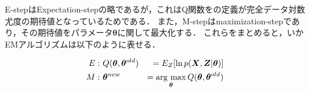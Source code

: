 E-stepはExpectation-stepの略であるが，これはQ関数をの定義が完全データ対数尤度の期待値となっているためである．
また，M-stepはmaximization-stepであり，その期待値をパラメータ$\bm \theta$に関して最大化する．
これらをまとめると，いかEMアルゴリズムは以下のように表せる．

\begin{eqnarray}
  E:& \ Q(\bm\theta, \bm\theta^{old})  &= E_{Z} [ \ln p(\bm X, \bm Z | \bm \theta)] \\
  M:& \ {\bm \theta^{new}} &= \mathop{\rm arg~max}\limits_{\bm\theta} Q(\bm\theta, \bm\theta^{old}) 
\end{eqnarray}
